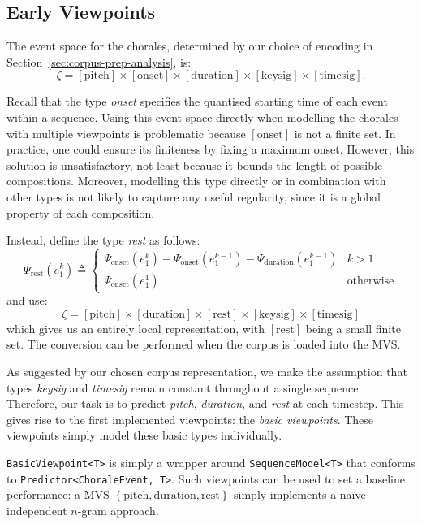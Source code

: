 \documentclass[12pt,a4paper,twoside,openright]{report}
\newcommand{\sref}[1]{Section~\ref{#1}}
\newcommand{\set}[1]{ \left\{ #1 \right\} }
\begin{document}
\subsection{Early Viewpoints}

The event space for the chorales, determined by our choice of encoding in
\sref{sec:corpus-prep-analysis}, is:
$$ \zeta = [\mathrm{pitch}] \times [\mathrm{onset}] \times [\mathrm{duration}]
\times [\mathrm{keysig}] \times [\mathrm{timesig}]. $$

Recall that the type \emph{onset} specifies the quantised starting time of each
event within a sequence. Using this event space directly when modelling the
chorales with multiple viewpoints is problematic because $[\mathrm{onset}]$ is
not a finite set. In practice, one could ensure its finiteness by fixing a
maximum onset. However, this solution is unsatisfactory, not least because it
bounds the length of possible compositions. Moreover, modelling this type
directly or in combination with other types is not likely to capture any useful
regularity, since it is a global property of each composition.

Instead, define the type \emph{rest} as follows:
$$ \Psi_{\mathrm{rest}}(e_1^k) \triangleq \begin{cases} 
  \Psi_{\mathrm{onset}}(e_1^k) -
  \Psi_{\mathrm{onset}}(e_1^{k-1}) - \Psi_{\mathrm{duration}}(e_1^{k-1}) & k > 1 \\
  \Psi_{\mathrm{onset}}(e_1^1) & \text{otherwise}
\end{cases} $$
and use:
$$ \zeta = [\mathrm{pitch}] \times [\mathrm{duration}] \times [\mathrm{rest}]
\times [\mathrm{keysig}] \times [\mathrm{timesig}] $$
which gives us an entirely local representation, with $[\mathrm{rest}]$ being a
small finite set. The conversion can be performed when the corpus is loaded into
the MVS. 

As suggested by our chosen corpus representation, we make the assumption that
types \emph{keysig} and \emph{timesig} remain constant throughout a single
sequence. Therefore, our task is to predict \emph{pitch}, \emph{duration}, and
\emph{rest} at each timestep. This gives rise to the first implemented
viewpoints: the \emph{basic viewpoints}. These viewpoints simply model these
basic types individually.

\texttt{BasicViewpoint<T>} is simply a wrapper around \texttt{SequenceModel<T>}
that conforms to \texttt{Predictor<ChoraleEvent, T>}. Such viewpoints can be
used to set a baseline performance: a MVS $\set{\mathrm{pitch},
\mathrm{duration}, \mathrm{rest}}$ simply implements a naïve independent
$n$-gram approach.
\end{document}

